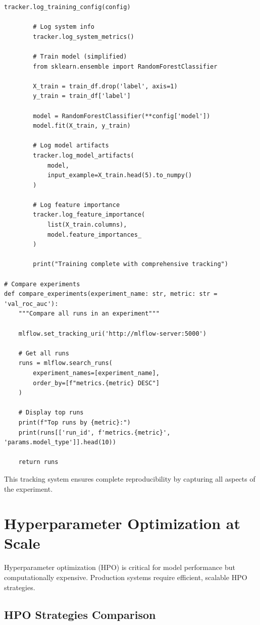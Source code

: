 \begin{lstlisting}[style=python, caption=Comprehensive Experiment Tracking with MLflow]
        tracker.log_training_config(config)

        # Log system info
        tracker.log_system_metrics()

        # Train model (simplified)
        from sklearn.ensemble import RandomForestClassifier

        X_train = train_df.drop('label', axis=1)
        y_train = train_df['label']

        model = RandomForestClassifier(**config['model'])
        model.fit(X_train, y_train)

        # Log model artifacts
        tracker.log_model_artifacts(
            model,
            input_example=X_train.head(5).to_numpy()
        )

        # Log feature importance
        tracker.log_feature_importance(
            list(X_train.columns),
            model.feature_importances_
        )

        print("Training complete with comprehensive tracking")

# Compare experiments
def compare_experiments(experiment_name: str, metric: str = 'val_roc_auc'):
    """Compare all runs in an experiment"""

    mlflow.set_tracking_uri('http://mlflow-server:5000')

    # Get all runs
    runs = mlflow.search_runs(
        experiment_names=[experiment_name],
        order_by=[f"metrics.{metric} DESC"]
    )

    # Display top runs
    print(f"Top runs by {metric}:")
    print(runs[['run_id', f'metrics.{metric}', 'params.model_type']].head(10))

    return runs
\end{lstlisting}

This tracking system ensures complete reproducibility by capturing all aspects of the experiment.

\section{Hyperparameter Optimization at Scale}

Hyperparameter optimization (HPO) is critical for model performance but computationally expensive. Production systems require efficient, scalable HPO strategies.

\subsection{HPO Strategies Comparison}

